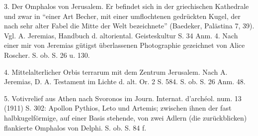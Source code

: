\documentclass[a4paper, 11pt, oneside]{article}
\begin{document}
3. Der Omphalos von Jerusalem. Er befindet sich in der griechischen Kathedrale und zwar in "`einer Art Becher, mit einer umflochtenen gedrückten Kugel, der nach sehr alter Fabel die Mitte der Welt bezeichnete"' (Baedeker, Palästina 7, 39). Vgl. A. Jeremias, Handbuch d. altoriental. Geisteskultur S. 34 Anm. 4. Nach einer mir von Jeremias gütigst überlassenen Photographie gezeichnet von Alice Roscher. S. ob. S. 26 u. 130.

4. Mittelalterlicher Orbis terrarum mit dem Zentrum Jerusalem. Nach A. Jeremias, D. A. Testament im Lichte d. alt. Or. 2 S. 584. S. ob. S. 26 Anm. 48.

5. Votivrelief aus Athen nach Svoronos im Journ. Internat. d'archéol. num. 13 (1911) S. 302: Apollon Pythios, Leto und Artemis; zwischen ihnen der fast halbkugelförmige, auf einer Basis stehende, von zwei Adlern (die zurückblicken) flankierte Omphalos von Delphi. S. ob. S. 84 f.
\end{document}
